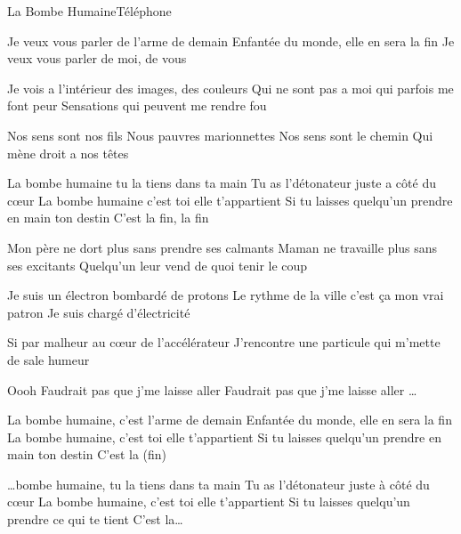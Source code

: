 \documentclass[a4paper,11pt,french]{article}
\begin{document}
\begin{Song}{La Bombe Humaine}{Téléphone}
\begin{multicols}{2}

\begin{Verse}
Je veux vous parler de l'arme de demain
Enfantée du monde, elle en sera la fin
Je veux vous parler de moi, de vous
\espaceInterStrophe

Je vois a l'intérieur des images, des couleurs
Qui ne sont pas a moi qui parfois me font peur
Sensations qui peuvent me rendre fou
\end{Verse}
\espaceInterStrophe

\begin{PreChorus}
Nos sens sont nos fils
Nous pauvres marionnettes
Nos sens sont le chemin
Qui mène droit a nos têtes
\end{PreChorus}
\espaceInterStrophe

\begin{Chorus}
La bombe humaine tu la tiens dans ta main
Tu as l'détonateur juste a côté du c\oe ur
La bombe humaine c'est toi elle t'appartient
Si tu laisses quelqu'un prendre en main ton destin
C'est la fin, la fin
\end{Chorus}
\espaceInterStrophe

\begin{Verse}
Mon père ne dort plus sans prendre ses calmants
Maman ne travaille plus sans ses excitants
Quelqu'un leur vend de quoi tenir le coup
\espaceInterStrophe

Je suis un électron bombardé de protons
Le rythme de la ville c'est ça mon vrai patron
Je suis chargé d'électricité
\end{Verse}
\espaceInterStrophe

\begin{PreChorus}
Si par malheur au c\oe ur
de l'accélérateur
J'rencontre une particule
qui m'mette de sale humeur
\end{PreChorus}
\columnbreak

\begin{Chorus}
Oooh
Faudrait pas que j'me laisse aller
Faudrait pas que j'me laisse aller
\dots
\espaceInterStrophe

La bombe humaine, c'est l'arme de demain
Enfantée du monde, elle en sera la fin
La bombe humaine, c'est toi elle t'appartient
Si tu laisses quelqu'un prendre en main ton destin
C'est la (fin)
\espaceInterStrophe

\dots bombe humaine, tu la tiens dans ta main
Tu as l'détonateur juste à côté du c\oe ur
La bombe humaine, c'est toi elle t'appartient
Si tu laisses quelqu'un prendre ce qui te tient
C'est la\dots
\espaceInterStrophe


\end{Chorus}
\end{multicols}
\end{Song}
\end{document}
